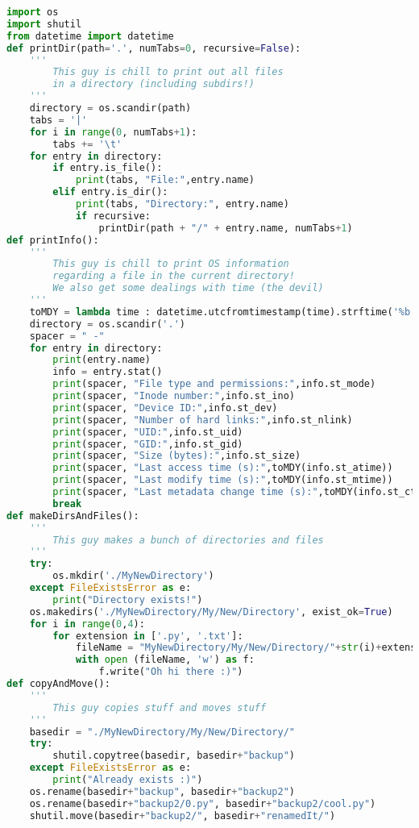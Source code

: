 \documentclass[12pt]{article}
\begin{document}
\begin{lstlisting}[language=Python]
import os
import shutil
from datetime import datetime
def printDir(path='.', numTabs=0, recursive=False):
    '''
        This guy is chill to print out all files
        in a directory (including subdirs!)
    '''
    directory = os.scandir(path)
    tabs = '|'
    for i in range(0, numTabs+1):
        tabs += '\t' 
    for entry in directory:
        if entry.is_file():
            print(tabs, "File:",entry.name)
        elif entry.is_dir():
            print(tabs, "Directory:", entry.name)
            if recursive:
                printDir(path + "/" + entry.name, numTabs+1)
def printInfo():
    '''
        This guy is chill to print OS information
        regarding a file in the current directory!
        We also get some dealings with time (the devil)
    '''
    toMDY = lambda time : datetime.utcfromtimestamp(time).strftime('%b %d, %Y - %H:%M:%S')
    directory = os.scandir('.')
    spacer = " -"
    for entry in directory:
        print(entry.name)
        info = entry.stat()
        print(spacer, "File type and permissions:",info.st_mode)
        print(spacer, "Inode number:",info.st_ino)
        print(spacer, "Device ID:",info.st_dev)
        print(spacer, "Number of hard links:",info.st_nlink)
        print(spacer, "UID:",info.st_uid)
        print(spacer, "GID:",info.st_gid)
        print(spacer, "Size (bytes):",info.st_size)
        print(spacer, "Last access time (s):",toMDY(info.st_atime))
        print(spacer, "Last modify time (s):",toMDY(info.st_mtime))
        print(spacer, "Last metadata change time (s):",toMDY(info.st_ctime))
        break
def makeDirsAndFiles():
    '''
        This guy makes a bunch of directories and files
    '''
    try:
        os.mkdir('./MyNewDirectory')
    except FileExistsError as e:
        print("Directory exists!")
    os.makedirs('./MyNewDirectory/My/New/Directory', exist_ok=True)
    for i in range(0,4):
        for extension in ['.py', '.txt']:
            fileName = "MyNewDirectory/My/New/Directory/"+str(i)+extension
            with open (fileName, 'w') as f:
                f.write("Oh hi there :)")
def copyAndMove():
    '''
        This guy copies stuff and moves stuff
    '''
    basedir = "./MyNewDirectory/My/New/Directory/"
    try:
        shutil.copytree(basedir, basedir+"backup")
    except FileExistsError as e:
        print("Already exists :)")
    os.rename(basedir+"backup", basedir+"backup2")
    os.rename(basedir+"backup2/0.py", basedir+"backup2/cool.py")
    shutil.move(basedir+"backup2/", basedir+"renamedIt/")

\end{lstlisting}
\end{document}
